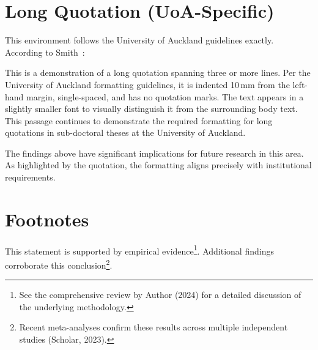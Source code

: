 \section{Long Quotation (UoA-Specific)}
\label{sec:quote}

This environment follows the University of Auckland guidelines exactly.
According to Smith~\parencite{example2024}:

\begin{uoaquote}
This is a demonstration of a long quotation spanning three or more
lines. Per the University of Auckland formatting guidelines, it is
indented 10\,mm from the left-hand margin, single-spaced, and has
no quotation marks. The text appears in a slightly smaller font to
visually distinguish it from the surrounding body text. This passage
continues to demonstrate the required formatting for long quotations
in sub-doctoral theses at the University of Auckland.
\end{uoaquote}

The findings above have significant implications for future research
in this area. As highlighted by the quotation, the formatting aligns
precisely with institutional requirements.

\section{Footnotes}
\label{sec:footnotes}

This statement is supported by empirical evidence\footnote{See the
comprehensive review by Author (2024) for a detailed discussion of
the underlying methodology.}. Additional findings corroborate this
conclusion\footnote{Recent meta-analyses confirm these results across
multiple independent studies (Scholar, 2023).}.

\endinput
